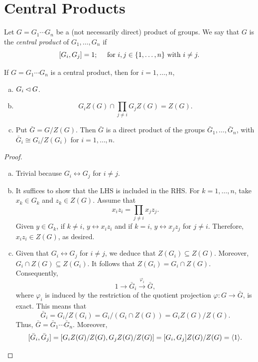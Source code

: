\section{Central Products}

\begin{defn}
    Let\/ $G=G_1\cdots G_n$ be a (not necessarily direct) product of groups. We say that\/ $G$ is the \textsl{central product} of\/ $G_1,\dots,G_n$ if
    $$
        [G_i,G_j]=1;\quad\text{ for }
            i,j\in\{1,\dots,n\} \text{ with }i\ne j.
    $$
\end{defn}

\begin{thm}
    If\/ $G=G_1\cdots G_n$ is a central product, then for\/ $i=1,\dots,n$,
    \begin{enumerate}[a),font=\upshape]
    \item $G_i\lhd G$.
    \item
    $$
        G_iZ(G)\cap\prod_{j\ne i} G_jZ(G) = Z(G).
    $$
    \item Put\/ $\bar G = G/Z(G)$. Then\/ $\bar G$ is a direct product of the groups\/ $\bar G_1, \dots,\bar G_n$, with\/ $\bar G_i\cong G_i/Z(G_i)$ for\/ $i= 1,\dots,n$.
    \end{enumerate}
\end{thm}

\begin{proof}${}$

\begin{enumerate}[a),font=\upshape]
    \item Trivial because $G_i\leftrightarrow G_j$ for $i\ne j$.

    \item It suffices to show that the LHS is included in the RHS. For $k=1,\dots,n$, take $x_k\in G_k$ and $z_k\in Z(G)$. Assume that
    $$
        x_iz_i=\prod_{j\ne i}x_jz_j.
    $$
    Given $y\in G_k$, if $k\ne i$, $y\leftrightarrow x_iz_i$ and if $k=i$, $y\leftrightarrow x_jz_j$ for $j\ne i$. Therefore, $x_iz_i\in Z(G)$, as desired.
    
    \item Given that $G_i\leftrightarrow G_j$ for $i\ne j$, we deduce that $Z(G_i)\subseteq Z(G)$. Moreover, $G_i\cap Z(G)\subseteq Z(G_i)$. It follows that $Z(G_i)=G_i\cap Z(G)$. Consequently,
    $$
        1\to \bar G_i\stackrel{\varphi_i}\to \bar G,
    $$
    where $\varphi_i$ is induced by the restriction of the quotient projection $\varphi\colon G\to\bar G$, is exact. This means that
    $$
        \bar G_i = G_i/Z(G_i) = G_i/(G_i\cap Z(G)) = G_iZ(G)/Z(G).
    $$
    Thus, $\bar G=\bar G_1\cdots\bar G_n$. Moreover,
    $$
        [\bar G_i,\bar G_j] = [G_iZ(G)/Z(G),G_jZ(G)/Z(G)]
            = [G_i,G_j]Z(G)/Z(G) = \langle1\rangle.
    $$
\end{enumerate}
\end{proof}

